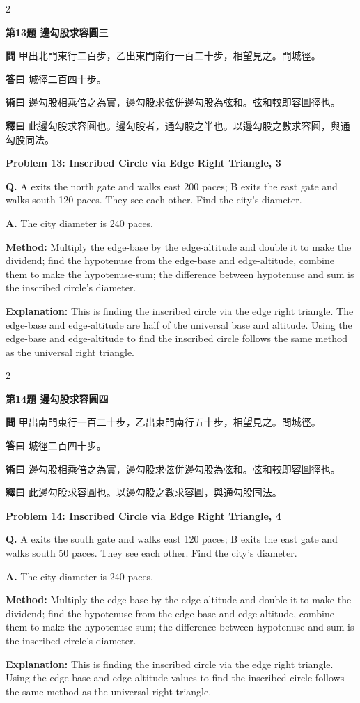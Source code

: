 \documentclass[11pt,a4paper]{article}
\newcommand{\wen}[1]{\noindent\textbf{問} #1\par\smallskip}
\newcommand{\da}[1]{\noindent\textbf{答曰} #1\par\smallskip}
\newcommand{\shu}[1]{\noindent\textbf{術曰} #1\par\smallskip}
\newcommand{\shi}[1]{\noindent\textbf{釋曰} #1\par\smallskip}
\newcommand{\wenE}[1]{\noindent\textbf{Q.} #1\par\smallskip}
\newcommand{\daE}[1]{\noindent\textbf{A.} #1\par\smallskip}
\newcommand{\shuE}[1]{\noindent\textbf{Method:} #1\par\smallskip}
\newcommand{\shiE}[1]{\noindent\textbf{Explanation:} #1\par\smallskip}
\begin{document}
\bigskip

\begin{paracol}{2}

\noindent\textbf{第13題 邊勾股求容圓三}

\wen{甲出北門東行二百步，乙出東門南行一百二十步，相望見之。問城徑。}
\da{城徑二百四十步。}
\shu{邊勾股相乘倍之為實，邊勾股求弦併邊勾股為弦和。弦和較即容圓徑也。}
\shi{此邊勾股求容圓也。邊勾股者，通勾股之半也。以邊勾股之數求容圓，與通勾股同法。}

\switchcolumn

\noindent\textbf{Problem 13: Inscribed Circle via Edge Right Triangle, 3}

\wenE{A exits the north gate and walks east 200 paces; B exits the east gate and walks south 120 paces. They see each other. Find the city's diameter.}
\daE{The city diameter is 240 paces.}
\shuE{Multiply the edge-base by the edge-altitude and double it to make the dividend; find the hypotenuse from the edge-base and edge-altitude, combine them to make the hypotenuse-sum; the difference between hypotenuse and sum is the inscribed circle's diameter.}
\shiE{This is finding the inscribed circle via the edge right triangle. The edge-base and edge-altitude are half of the universal base and altitude. Using the edge-base and edge-altitude to find the inscribed circle follows the same method as the universal right triangle.}

\end{paracol}

\bigskip

\begin{paracol}{2}

\noindent\textbf{第14題 邊勾股求容圓四}

\wen{甲出南門東行一百二十步，乙出東門南行五十步，相望見之。問城徑。}
\da{城徑二百四十步。}
\shu{邊勾股相乘倍之為實，邊勾股求弦併邊勾股為弦和。弦和較即容圓徑也。}
\shi{此邊勾股求容圓也。以邊勾股之數求容圓，與通勾股同法。}

\switchcolumn

\noindent\textbf{Problem 14: Inscribed Circle via Edge Right Triangle, 4}

\wenE{A exits the south gate and walks east 120 paces; B exits the east gate and walks south 50 paces. They see each other. Find the city's diameter.}
\daE{The city diameter is 240 paces.}
\shuE{Multiply the edge-base by the edge-altitude and double it to make the dividend; find the hypotenuse from the edge-base and edge-altitude, combine them to make the hypotenuse-sum; the difference between hypotenuse and sum is the inscribed circle's diameter.}
\shiE{This is finding the inscribed circle via the edge right triangle. Using the edge-base and edge-altitude values to find the inscribed circle follows the same method as the universal right triangle.}

\end{paracol}
\end{document}
